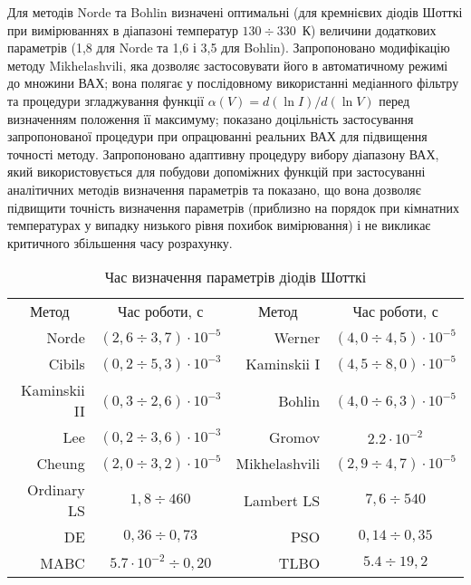 Для методів Norde та Bohlin визначені  оптимальні (для кремнієвих діодів Шотткі при вимірюваннях в діапазоні температур $130\div330$~К) величини додаткових параметрів (1,8 для Norde та 1,6 і 3,5 для Bohlin).
Запропоновано модифікацію методу Mikhelashvili, яка дозволяє застосовувати його в автоматичному режимі до множини ВАХ;
вона полягає у послідовному використанні медіанного фільтру та процедури згладжування функції $\alpha(V)=d(\ln I)/d(\ln V)$ перед визначенням положення її максимуму;
показано доцільність застосування запропонованої процедури при опрацюванні реальних ВАХ для підвищення точності методу.
Запропоновано адаптивну процедуру вибору діапазону ВАХ, який використовується для побудови допоміжних функцій при застосуванні аналітичних методів визначення параметрів та показано, що вона дозволяє підвищити точність визначення параметрів (приблизно на порядок при кімнатних температурах у випадку низького рівня похибок вимірювання) і не викликає критичного збільшення часу розрахунку.

\begin{table}[t]
\caption{\label{tabRT}Час визначення параметрів діодів Шотткі}
\centering
\begin{tabular}{|r|c|r|c|}
\hline
\multicolumn{1}{|c|}{Метод}&Час роботи, с &\multicolumn{1}{c|}{Метод}&Час роботи, с\\ \hhline{|====|}
Norde &$(2,6\div3,7)\cdot10^{-5}$& Werner  &$(4,0\div4,5)\cdot10^{-5}$\\ \hline
Cibils  &$(0,2\div5,3)\cdot10^{-3}$& Kaminskii I &$(4,5\div8,0)\cdot10^{-5}$\\ \hline
Kaminskii II &$(0,3\div2,6)\cdot10^{-3}$& Bohlin &$(4,0\div6,3)\cdot10^{-5}$\\ \hline
Lee &$(0,2\div3,6)\cdot10^{-3}$& Gromov &$2.2\cdot10^{-2}$\\ \hline
Cheung &$(2,0\div3,2)\cdot10^{-5}$&Mikhelashvili &$(2,9\div4,7)\cdot10^{-5}$\\ \hline
Ordinary LS &$1,8\div460$&Lambert LS &$7,6\div540$\\ \hline
DE &$0,36\div0,73$&PSO &$0,14\div0,35$\\ \hline
MABC &$5.7\cdot10^{-2}\div0,20$&TLBO &$5.4\div19,2$ \\
\hline
\end{tabular}
\end{table}

